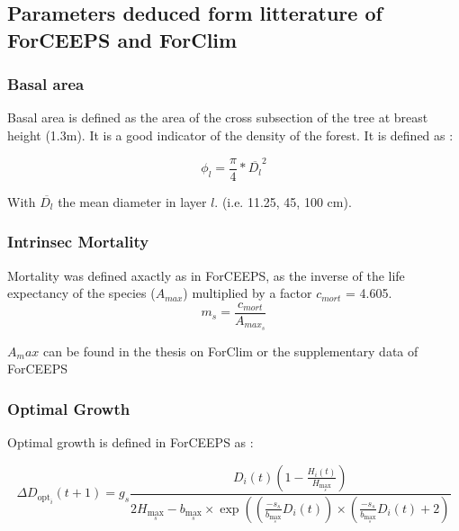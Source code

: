 \documentclass{article}
\begin{document}
\subsection{Parameters deduced form litterature of ForCEEPS and ForClim}

\subsubsection{Basal area}

Basal area is defined as the area of the cross subsection of the tree at breast height (1.3m). It is a good indicator of the density of the forest. It is defined as : 

\begin{equation}
    \phi_{l} = \frac{\pi}{4} * \overline{D_{l}}^2
\end{equation}

With $\overline{D_{l}}$ the mean diameter in layer $l$. (i.e. 11.25, 45, 100 cm).\\

\subsubsection{Intrinsec Mortality}

Mortality was defined axactly as in ForCEEPS, as the inverse of the life expectancy of the species ($A_{max}$) multiplied by a factor $c_{mort}$ = 4.605.
\begin{equation}
    m_s = \frac{c_{mort}}{A_{max_s}}
\end{equation}

$A_max$ can be found in the thesis on ForClim \autocite{bugmannEcologyMountainousForests1965} or the supplementary data of ForCEEPS \autocite{morinForestSuccessionGap2021}

\subsubsection{Optimal Growth}

Optimal growth is defined in ForCEEPS \autocite{morinForestSuccessionGap2021} as :

\begin{equation}
    \Delta D_{\mathrm{opt}_i}(t+1)=g_s \frac{D_i(t)\left(1-\frac{H_i(t)}{H_{\max _s}}\right)}{2 H_{\max _s}-b_{\max _s} \times \exp \left(\left(\frac{-s_s}{b_{\max _s}} D_i(t)\right) \times\left(\frac{-s_s}{b_{\max _s}} D_i(t)+2\right)\right.}
\end{equation}
\end{document}
